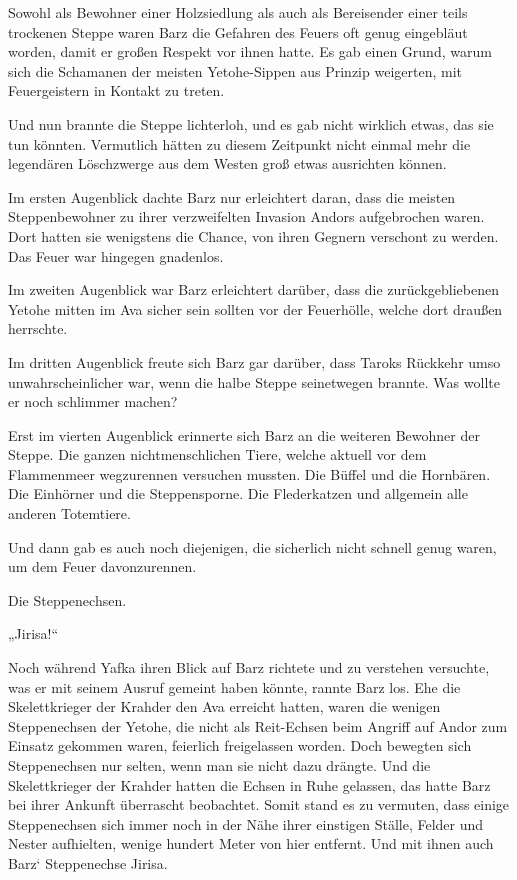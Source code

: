 Sowohl als Bewohner einer Holzsiedlung als auch als Bereisender einer teils trockenen Steppe waren Barz die Gefahren des Feuers oft genug eingebläut worden, damit er großen Respekt vor ihnen hatte. Es gab einen Grund, warum sich die Schamanen der meisten Yetohe-Sippen aus Prinzip weigerten, mit Feuergeistern in Kontakt zu treten.

Und nun brannte die Steppe lichterloh, und es gab nicht wirklich etwas, das sie tun könnten. Vermutlich hätten zu diesem Zeitpunkt nicht einmal mehr die legendären Löschzwerge aus dem Westen groß etwas ausrichten können.

Im ersten Augenblick dachte Barz nur erleichtert daran, dass die meisten Steppenbewohner zu ihrer verzweifelten Invasion Andors aufgebrochen waren. Dort hatten sie wenigstens die Chance, von ihren Gegnern verschont zu werden. Das Feuer war hingegen gnadenlos.

Im zweiten Augenblick war Barz erleichtert darüber, dass die zurückgebliebenen Yetohe mitten im Ava sicher sein sollten vor der Feuerhölle, welche dort draußen herrschte.

Im dritten Augenblick freute sich Barz gar darüber, dass Taroks Rückkehr umso unwahrscheinlicher war, wenn die halbe Steppe seinetwegen brannte. Was wollte er noch schlimmer machen?

Erst im vierten Augenblick erinnerte sich Barz an die weiteren Bewohner der Steppe. Die ganzen nichtmenschlichen Tiere, welche aktuell vor dem Flammenmeer wegzurennen versuchen mussten. Die Büffel und die Hornbären. Die Einhörner und die Steppensporne. Die Flederkatzen und allgemein alle anderen Totemtiere.

Und dann gab es auch noch diejenigen, die sicherlich nicht schnell genug waren, um dem Feuer davonzurennen.

Die Steppenechsen.

„Jirisa!“

Noch während Yafka ihren Blick auf Barz richtete und zu verstehen versuchte, was er mit seinem Ausruf gemeint haben könnte, rannte Barz los. Ehe die Skelettkrieger der Krahder den Ava erreicht hatten, waren die wenigen Steppenechsen der Yetohe, die nicht als Reit-Echsen beim Angriff auf Andor zum Einsatz gekommen waren, feierlich freigelassen worden. Doch bewegten sich Steppenechsen nur selten, wenn man sie nicht dazu drängte. Und die Skelettkrieger der Krahder hatten die Echsen in Ruhe gelassen, das hatte Barz bei ihrer Ankunft überrascht beobachtet. Somit stand es zu vermuten, dass einige Steppenechsen sich immer noch in der Nähe ihrer einstigen Ställe, Felder und Nester aufhielten, wenige hundert Meter von hier entfernt. Und mit ihnen auch Barz‘ Steppenechse Jirisa.

